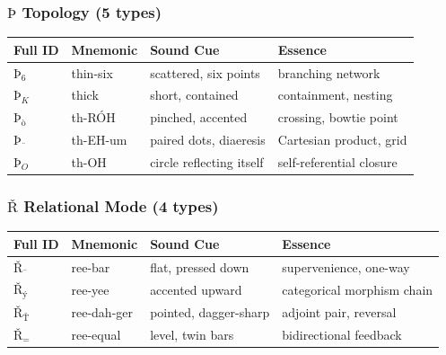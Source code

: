 \documentclass[12pt,a4paper]{article}
\begin{document}
\subsubsection{$Þ$ Topology (5 types)}

\begin{table}[htbp]
\centering
\small
{}
\begin{tabularx}{\textwidth}{>{\centering\arraybackslash}X >{\centering\arraybackslash}X >{\centering\arraybackslash}X >{\centering\arraybackslash}X}
\toprule
\rowcolor{gray!25}\textbf{Full ID} & \textbf{Mnemonic} & \textbf{Sound Cue} & \textbf{Essence} \\
\midrule
\rowcolors{1}{white}{gray!10}
$Þ_{6}$ & thin-six & scattered, six points & branching network \\
$Þ_{K}$ & thick & short, contained & containment, nesting \\
$Þ_{\text{ò}}$ & th-RÓH & pinched, accented & crossing, bowtie point \\
$Þ_{\text{¨}}$ & th-EH-um & paired dots, diaeresis & Cartesian product, grid \\
$Þ_{O}$ & th-OH & circle reflecting itself & self-referential closure \\
\bottomrule
\end{tabularx}
\end{table}

\subsubsection{$Ř$ Relational Mode (4 types)}

\begin{table}[htbp]
\centering
\small
{}
\begin{tabularx}{\textwidth}{>{\centering\arraybackslash}X >{\centering\arraybackslash}X >{\centering\arraybackslash}X >{\centering\arraybackslash}X}
\toprule
\rowcolor{gray!25}\textbf{Full ID} & \textbf{Mnemonic} & \textbf{Sound Cue} & \textbf{Essence} \\
\midrule
\rowcolors{1}{white}{gray!10}
$Ř_{\text{¯}}$ & ree-bar & flat, pressed down & supervenience, one-way \\
$Ř_{\text{ý}}$ & ree-yee & accented upward & categorical morphism chain \\
$Ř_{\text{Ť}}$ & ree-dah-ger & pointed, dagger-sharp & adjoint pair, reversal \\
$Ř_{=}$ & ree-equal & level, twin bars & bidirectional feedback \\
\bottomrule
\end{tabularx}
\end{table}
\end{document}
